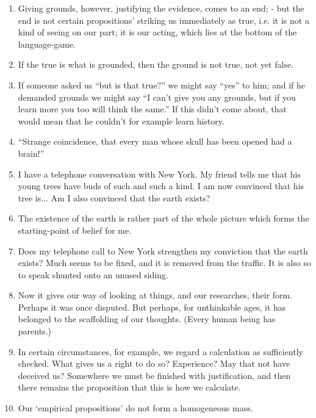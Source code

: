 \documentclass{book}
\begin{document}
\begin{enumerate}
\item
Giving grounds, however, justifying the evidence, comes to an end; - but the
end is not certain propositions' striking us immediately as true, i.e. it is
not a kind of seeing on our part; it is our acting, which lies at the bottom of
the language-game.

\item
If the true is what is grounded, then the ground is not true, not yet false.

\item
If someone asked us ``but is that true?'' we might say ``yes'' to him; and if
he demanded grounds we might say ``I can't give you any grounds, but if you
learn more you too will think the same.'' If this didn't come about, that would
mean that he couldn't for example learn history.

\item
``Strange coincidence, that every man whose skull has been opened had a
brain!''

\item
I have a telephone conversation with New York. My friend tells me that his
young trees have buds of such and such a kind. I am now convinced that his tree
is... Am I also convinced that the earth exists?

\item
The existence of the earth is rather part of the whole picture which forms the
starting-point of belief for me.

\item
Does my telephone call to New York strengthen my conviction that the earth
exists?  Much seems to be fixed, and it is removed from the traffic. It is also
so to speak shunted onto an unused siding.

\item
Now it gives our way of looking at things, and our researches, their form.
Perhaps it was once disputed. But perhaps, for unthinkable ages, it has
belonged to the scaffolding of our thoughts. (Every human being has parents.)

\item
In certain circumstances, for example, we regard a calculation as sufficiently
checked. What gives us a right to do so? Experience? May that not have deceived
us? Somewhere we must be finished with justification, and then there remains
the proposition that this is how we calculate.

\item
Our `empirical propositions' do not form a homogeneous mass.


\end{enumerate}
\end{document}
